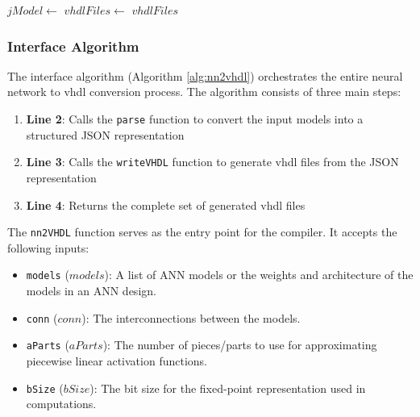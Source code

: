 \begin{algorithm}[htbp]
    \caption{Compile TensorFlow/PyTorch Models to \gls{vhdl}}\label{alg:nn2vhdl}
    \begin{algorithmic}[1]
        \State $jModel \gets$ 
        \State $vhdlFiles \gets$ 
        \State \Return $vhdlFiles$
    \EndFunction
    \end{algorithmic}
\end{algorithm}




\subsubsection{Interface Algorithm}
The interface algorithm (Algorithm \ref{alg:nn2vhdl}) orchestrates the entire neural network to \gls{vhdl} conversion process. The algorithm consists of three main steps:

\begin{enumerate}
    \item \textbf{Line 2}: Calls the \texttt{parse} function to convert the input models into a structured JSON representation
    \item \textbf{Line 3}: Calls the \texttt{writeVHDL} function to generate \gls{vhdl} files from the JSON representation
    \item \textbf{Line 4}: Returns the complete set of generated \gls{vhdl} files
\end{enumerate}

The \texttt{nn2VHDL} function serves as the entry point for the compiler. It accepts the following inputs: 
\begin{itemize}
    \item \texttt{models} ($models$): A list of ANN models or the weights and architecture of the models in an ANN design.
    \item \texttt{conn} ($conn$): The interconnections between the models.
    \item \texttt{aParts} ($aParts$): The number of pieces/parts to use for approximating piecewise linear activation functions. 
    \item \texttt{bSize} ($bSize$): The bit size for the fixed-point representation used in computations. 
\end{itemize}


